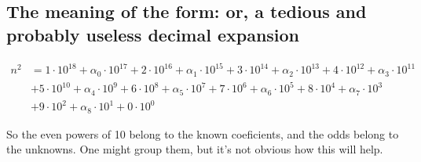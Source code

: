 \subsection{The meaning of the form: or, a tedious and probably useless decimal expansion}

\begin{align*}
    n^2 &= 1 \cdot 10^{18} + \alpha_0 \cdot 10^{17} + 2 \cdot 10^{16} + \alpha_1 \cdot 10^{15} 
        + 3 \cdot 10^{14} + \alpha_2 \cdot 10^{13} + 4 \cdot 10^{12} + \alpha_3 \cdot 10^{11} \\
        &+ 5 \cdot 10^{10} + \alpha_4 \cdot 10^{9} + 6 \cdot 10^{8} + \alpha_5 \cdot 10^{7} 
        + 7 \cdot 10^{6} + \alpha_6 \cdot 10^{5} + 8 \cdot 10^{4} + \alpha_7 \cdot 10^{3} \\
        &+ 9 \cdot 10^{2} + \alpha_8 \cdot 10^{1} + 0 \cdot 10^{0} 
\end{align*}

So the even powers of 10 belong to the known coeficients, and the odds belong to the unknowns.  One might group
them, but it's not obvious how this will help.